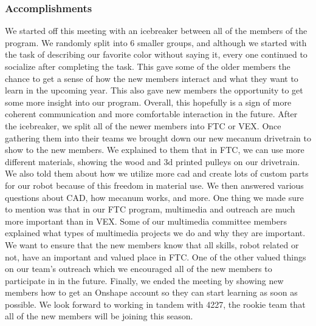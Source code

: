 \subsubsection*{Accomplishments}
We started off this meeting with an icebreaker between all of the members of the program. We randomly split into 6 smaller groups, and although we started with the task of describing our favorite color without saying it, every one continued to socialize after completing the task. This gave some of the older members the chance to get a sense of how the new members interact and what they want to learn in the upcoming year. This also gave new members the opportunity to get some more insight into our program. Overall, this hopefully is a sign of more coherent communication and more comfortable interaction in the future.
After the icebreaker, we split all of the newer members into FTC or VEX. Once gathering them into their teams we brought down our new mecanum drivetrain to show to the new members. We explained to them that in FTC, we can use more different materials, showing the wood and 3d printed pulleys on our drivetrain. We also told them about how we utilize more cad and create lots of custom parts for our robot because of this freedom in material use. We then answered various questions about CAD, how mecanum works, and more.
One thing we made sure to mention was that in our FTC program, multimedia and outreach are much more important than in VEX. Some of our multimedia committee members explained what types of multimedia projects we do and why they are important. We want to ensure that the new members know that all skills, robot related or not, have an important and valued place in FTC. One of the other valued things on our team's outreach which we encouraged all of the new members to participate in in the future.
Finally, we ended the meeting by showing new members how to get an Onshape account so they can start learning as soon as possible. We look forward to working in tandem with 4227, the rookie team that all of the new members will be joining this season.